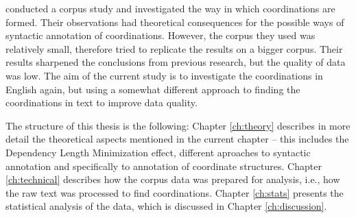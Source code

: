 \cite{prz:woz:23} conducted a corpus study and investigated the way in which coordinations are formed. Their observations had theoretical consequences for the possible ways of syntactic annotation of coordinations. However, the corpus they used was relatively small, therefore \cite{prz:etal:24} tried to replicate the results on a bigger corpus. Their results sharpened the conclusions from previous research, but the quality of data was low. The aim of the current study is to investigate the coordinations in English again, but using a somewhat different approach to finding the coordinations in text to improve data quality.

The structure of this thesis is the following: Chapter \ref{ch:theory} describes in more detail the theoretical aspects mentioned in the current chapter -- this includes the Dependency Length Minimization effect, different aproaches to syntactic annotation and specifically to annotation of coordinate structures. Chapter \ref{ch:technical} describes how the corpus data was prepared for analysis, i.e., how the raw text was processed to find coordinations. Chapter \ref{ch:stats} presents the statistical analysis of the data, which is discussed in Chapter \ref{ch:discussion}.